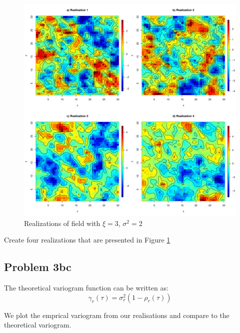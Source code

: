 \documentclass[]{article}
\begin{document}
\begin{figure}

{\centering \includegraphics{Exercise-1_files/figure-latex/fig3a1-1} 

}

\caption{\label{fig:fig3a1} Realizations of field with $\xi = 3$, $\sigma^2 = 2$}\label{fig:fig3a1}
\end{figure}

Create four realizations that are presented in Figure \ref{fig:fig3a1}

\hypertarget{problem-3bc}{%
\subsection{Problem 3bc}\label{problem-3bc}}

The theoretical variogram function can be written as: \begin{equation}
    \gamma_r(\tau) =  \sigma_r^2(1-\rho_r(\tau))
\end{equation}

We plot the emprical variogram from our realisations and compare to the
theoretical variogram.
\end{document}
